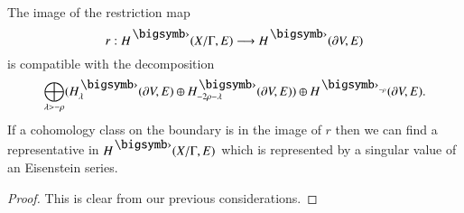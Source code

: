 \setcounter{equation}{6}
\begin{coro}\label{art5-coro4.7}
The image of the restriction map
$$
r : H^\bigdot (X/ \Gamma, E) \longrightarrow H^\bigdot (\partial V, E)
$$
is compatible with the decomposition
$$
\bigoplus_{\lambda > -\rho} (H^\bigdot_\lambda(\partial V, E) \oplus H^{\bigdot}_{-2\rho -\lambda} (\partial V, E)) \oplus H^{\bigdot_{-\rho}} (\partial V, E).
$$
If a cohomology class on the boundary is in the image of $r$ then we can find a representative in $H^\bigdot (X/ \Gamma , E)$ which is represented by a singular value of an Eisenstein series.
\end{coro}

\begin{proof}
This is clear from our previous considerations.
\end{proof}

